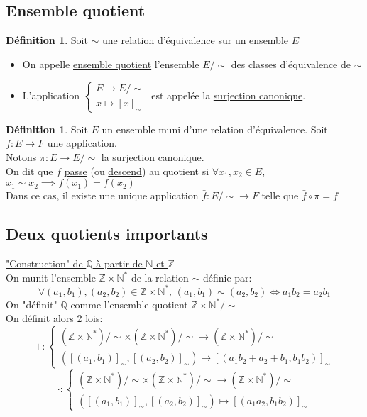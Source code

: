 \documentclass[10pt,a4paper]{article}
\theoremstyle{definition}
\newtheorem{definition}[proposition]{Définition}
\begin{document}
\subsection{Ensemble quotient}
\begin{definition}
Soit $\sim$ une relation d'équivalence sur un ensemble $E$
\begin{itemize}
\item On appelle \uline{ensemble quotient} l'ensemble $E/\sim$ des classes d'équivalence de $\sim$
\item L'application $\begin{cases}
E \to E / \sim \\
x \mapsto \left[ x \right]_\sim
\end{cases}$ est appelée la \uline{surjection canonique}.
\end{itemize}
\end{definition}
\begin{definition}
Soit $E$ un ensemble muni d'une relation d'équivalence. Soit $f: E \to F$ une application. \\
Notons $\pi: E \to E / \sim$ la surjection canonique. \\
On dit que $f$ \uline{passe} (ou \uline{descend}) au quotient si $\forall x_1, x_2 \in E$, $x_1 \sim x_2 \implies f(x_1) = f(x_2)$ \\
Dans ce cas, il existe une unique application $\bar{f}: E / \sim \to F$ telle que $\bar{f} \circ \pi = f$
\end{definition}

\pagebreak

\subsection{Deux quotients importants}
\noindent \uline{"Construction" de $\mathbb{Q}$ à partir de $\mathbb{N}$ et $\mathbb{Z}$} \\
On munit l'ensemble $\mathbb{Z} \times \mathbb{N}^*$ de la relation $\sim$ définie par: \\
\[ \forall (a_1, b_1), (a_2, b_2) \in \mathbb{Z} \times \mathbb{N}^*,\, (a_1, b_1) \sim (a_2, b_2) \iff a_1 b_2 = a_2 b_1 \]
On "définit" $\mathbb{Q}$ comme l'ensemble quotient $\mathbb{Z} \times \mathbb{N}^* / \sim$ \\
On définit alors 2 lois:
\[ + : \begin{cases}
(\mathbb{Z} \times \mathbb{N}^*) / \sim \times (\mathbb{Z} \times \mathbb{N}^*) / \sim \to (\mathbb{Z} \times \mathbb{N}^*) / \sim \\
(\left[(a_1, b_1)\right]_\sim , \left[(a_2, b_2)\right]_\sim) \mapsto \left[(a_1 b_2 + a_2 + b_1, b_1 b_2)\right]_\sim
\end{cases}\]
\[\cdot: \begin{cases}
(\mathbb{Z} \times \mathbb{N}^*) / \sim \times (\mathbb{Z} \times \mathbb{N}^*) / \sim \to (\mathbb{Z} \times \mathbb{N}^*) / \sim \\
(\left[(a_1, b_1)\right]_\sim , \left[(a_2, b_2)\right]_\sim) \mapsto \left[(a_1 a_2, b_1 b_2)\right]_\sim
\end{cases}\] \medskip
\end{document}

